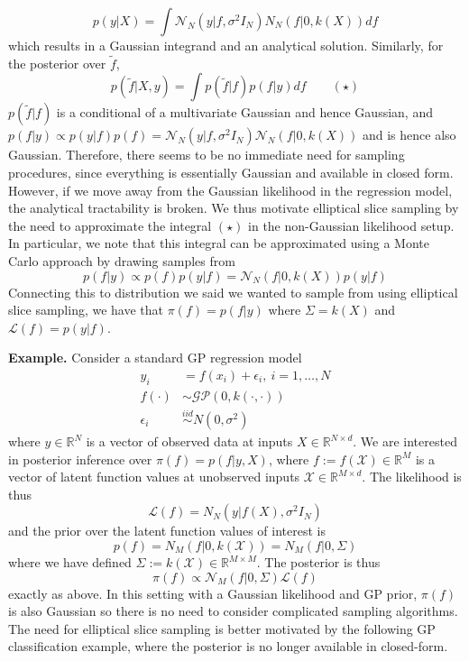\documentclass[12pt]{article}
\newcommand{\R}{\mathcal{R}}
\def\R{\mathbb{R}}
\begin{document}
\[p(y|X) = \int \mathcal{N}_N(y|f, \sigma^2I_N)N_{N}(f|0, k(X)) df\] 
which results in a Gaussian integrand and an analytical solution. Similarly, for the posterior over $\tilde{f}$, 
\[p(\tilde{f}|X, y) = \int p(\tilde{f}|f)p(f|y) df \qquad (\star)\]
$p(\tilde{f}|f)$ is a conditional of a multivariate Gaussian and hence Gaussian, and $p(f|y) \propto p(y|f)p(f) = \mathcal{N}_N(y|f, \sigma^2 I_N)\mathcal{N}_N(f|0, k(X))$ and is 
hence also Gaussian. Therefore, there seems to be no immediate need for sampling procedures, since everything is essentially Gaussian and available in closed form. However, if we
move away from the Gaussian likelihood in the regression model, the analytical tractability is broken. We thus motivate elliptical slice sampling by the need to approximate the integral 
$(\star)$ in the non-Gaussian likelihood setup. In particular, we note that this integral can be approximated using a Monte Carlo approach by drawing samples from
\[p(f|y) \propto p(f) p(y|f) = \mathcal{N}_N(f|0, k(X))p(y|f)\]
Connecting this to distribution we said we wanted to sample from using elliptical slice sampling, we have that $\pi(f) = p(f|y)$ where $\Sigma = k(X)$ and $\mathcal{L}(f) = p(y|f)$. 


\bigskip
\noindent
\textbf{Example.} Consider a standard GP regression model
\begin{align*}
y_i &= f(x_i) + \epsilon_i, \ i = 1, \dots, N \\
f(\cdot) &\sim \mathcal{GP}(0, k(\cdot, \cdot)) \\
\epsilon_i &\overset{iid}{\sim} N(0, \sigma^2)
\end{align*}
where $y \in \R^N$ is a vector of observed data at inputs $X \in \R^{N \times d}$. We are interested in posterior inference over $\pi(f) = p(f|y, X)$, where $f := f(\mathcal{X}) \in \R^M$ is a vector 
of latent function values at unobserved inputs $\mathcal{X} \in \R^{M \times d}$. The likelihood is thus
\[\mathcal{L}(f) = N_N(y|f(X), \sigma^2 I_N)\]
and the prior over the latent function values of interest is 
\[p(f) = N_M(f|0, k(\mathcal{X})) = N_M(f|0, \Sigma)\]
where we have defined $\Sigma := k(\mathcal{X}) \in \R^{M \times M}$. The posterior is thus
\[\pi(f) \propto \mathcal{N}_M(f|0, \Sigma)\mathcal{L}(f)\]
exactly as above. In this setting with a Gaussian likelihood and GP prior, $\pi(f)$ is also Gaussian so there is no need to consider complicated sampling algorithms. The need for elliptical slice 
sampling is better motivated by the following GP classification example, where the posterior is no longer available in closed-form. 
\end{document}
